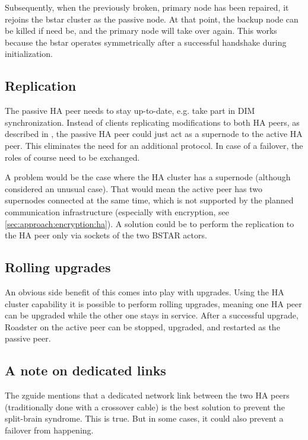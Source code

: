 Subsequently, when the previously broken, primary node has been repaired, it
rejoins the \gls{bstar} cluster as the passive node. At that point, the backup
node can be killed if need be, and the primary node will take over again.  This
works because the \gls{bstar} operates symmetrically after a successful
handshake during initialization.

\subsection{Replication}
The passive HA peer needs to stay up-to-date, e.g. take part in DIM
synchronization. Instead of clients replicating modifications to both HA peers, as
described in \cite[Chapter 5 - Advanced Pub-Sub Patterns, The Clustered Hashmap
Protocol]{zmq:zguide}, the passive HA peer could just act as a supernode to the
active HA peer. This eliminates the need for an additional protocol. In case of
a failover, the roles of course need to be exchanged.

{\color{red}A problem would be the case where the HA cluster has a supernode (although
considered an unusual case). That would mean the active peer has two supernodes
connected at the same time, which is not supported by the planned communication
infrastructure (especially with encryption, see
\autoref{sec:approach:encryption:ha}).  A solution could be to perform the
replication to the HA peer only via sockets of the two BSTAR actors.}

\subsection{Rolling upgrades}
An obvious side benefit of this comes into play with upgrades. Using the HA
cluster capability it is possible to perform rolling upgrades, meaning one HA
peer can be upgraded while the other one stays in service. After a successful
upgrade, Roadster on the active peer can be stopped, upgraded, and restarted as
the passive peer.

\subsection{A note on dedicated links}
The \gls{zguide} mentions that a dedicated network link between the two HA peers
(traditionally done with a crossover cable) is the best solution to prevent the
split-brain syndrome. This is true. But in some cases, it could also prevent a
failover from happening.

